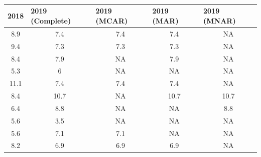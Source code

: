 \documentclass{beamer}
\begin{document}
\begin{frame}
\frametitle{}
\begin{table}[]
	\begin{tabular}{ccccc}
		\multicolumn{1}{l}{2018} & \multicolumn{1}{l}{2019 (Complete)}& \multicolumn{1}{l}{2019 (MCAR)} & \multicolumn{1}{l}{2019 (MAR)} & \multicolumn{1}{l}{2019 (MNAR)} \\ \hline
		8.9                      & 7.4                                 & 7.4                             & 7.4                            & NA                              \\
		9.4                      & 7.3                                 & 7.3                             & 7.3                            & NA                              \\
		8.4                      & 7.9                                 & NA                              & 7.9                            & NA                              \\
		5.3                      & 6                                   & NA                              & NA                             & NA                              \\
		11.1                     & 7.4                                 & 7.4                             & 7.4                            & NA                              \\
		8.4                      & 10.7                                & NA                              & 10.7                           & 10.7                            \\
		6.4                      & 8.8                                 & NA                              & NA                             & 8.8                             \\
		5.6                      & 3.5                                 & NA                              & NA                             & NA                              \\
		5.6                      & 7.1                                 & 7.1                             & NA                             & NA                              \\
		8.2                      & 6.9                                 & 6.9                             & 6.9                            & NA                              
	\end{tabular}
	
\end{table}
\end{frame}
\end{document}
